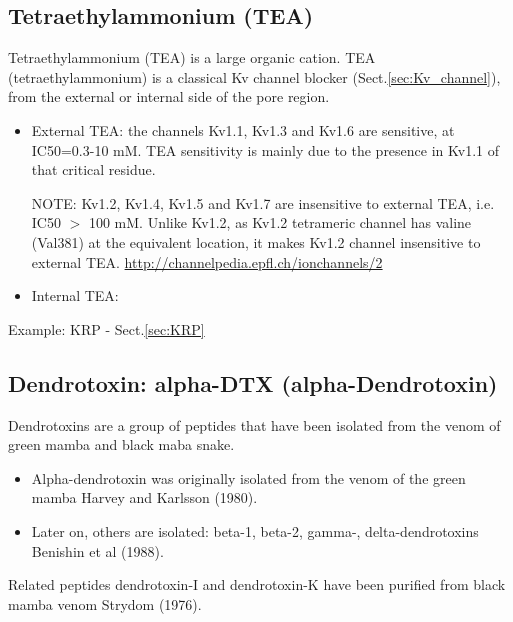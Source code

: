 \subsection{Tetraethylammonium (TEA)}
\label{sec:tetraethylammonium}
\label{sec:TEA}

Tetraethylammonium (TEA) is a large organic cation. TEA (tetraethylammonium) is
a classical Kv channel blocker (Sect.\ref{sec:Kv_channel}), from the external or
internal side of the pore region.

\begin{itemize}
  
  \item External TEA: the channels Kv1.1, Kv1.3 and Kv1.6 are sensitive, at
  IC50=0.3-10 mM. TEA sensitivity is mainly due to the presence in Kv1.1 of that
  critical residue.
   
NOTE: Kv1.2, Kv1.4, Kv1.5 and Kv1.7 are insensitive to external TEA, i.e. IC50
$>$ 100 mM.
Unlike Kv1.2, as Kv1.2 tetrameric channel has valine (Val381) at the
equivalent location, it makes Kv1.2 channel insensitive to external TEA.
\url{http://channelpedia.epfl.ch/ionchannels/2}
  
  \item Internal TEA: 
\end{itemize}

Example: KRP - Sect.\ref{sec:KRP}

\subsection{Dendrotoxin: alpha-DTX (alpha-Dendrotoxin)}
\label{sec:dendrotoxin}
\label{sec:alpha-DTX}

Dendrotoxins are a group of peptides that have been isolated from the venom of
green mamba and black maba snake. 
\begin{itemize}
  \item  Alpha-dendrotoxin was originally isolated from the venom of the green
  mamba Harvey and Karlsson (1980). 
  
  \item Later on, others are isolated: beta-1, beta-2, gamma-,
  delta-dendrotoxins Benishin et al (1988).
\end{itemize}
Related peptides dendrotoxin-I and dendrotoxin-K have been purified from black
mamba venom Strydom (1976).

